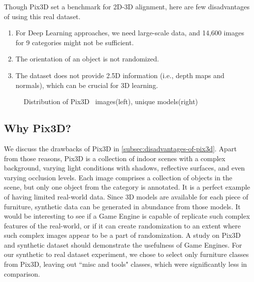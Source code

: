 Though Pix3D set a benchmark for 2D-3D alignment, here are few disadvantages of using this real dataset.
\begin{enumerate}
    \item For Deep Learning approaches, we need large-scale data, and 14,600 images for 9 categories might not be sufficient.
    \item The orientation of an object is not randomized.
    \item The dataset does not provide 2.5D information (i.e., depth maps and normals), which can be crucial for 3D learning.
\end{enumerate}

\begin{figure}[!ht]
    \resizebox{0.49\textwidth}{6cm}{}
    \resizebox{0.49\textwidth}{6cm}{}
    \caption[Distribution of Pix3D.]{Distribution of Pix3D~\cite{Sun2018} images(left), unique models(right)}
    \label{fig:pix3d_histogram}
\end{figure}

\subsection{Why Pix3D?}\label{subsec:why-pix3d?}
We discuss the drawbacks of Pix3D in \autoref{subsec:disadvantages-of-pix3d}.
Apart from those reasons, Pix3D is a collection of indoor scenes with a complex background, varying light conditions with shadows, reflective surfaces, and even varying occlusion levels.
Each image comprises a collection of objects in the scene, but only one object from the category is annotated.
It is a perfect example of having limited real-world data.
Since 3D models are available for each piece of furniture, synthetic data can be generated in abundance from those models.
It would be interesting to see if a Game Engine is capable of replicate such complex features of the real-world, or if it can create randomization to an extent where such complex images appear to be a part of randomization.
A study on Pix3D and synthetic dataset should demonstrate the usefulness of Game Engines.
For our synthetic to real dataset experiment, we chose to select only furniture classes from Pix3D, leaving out ``misc and tools" classes, which were significantly less in comparison.


